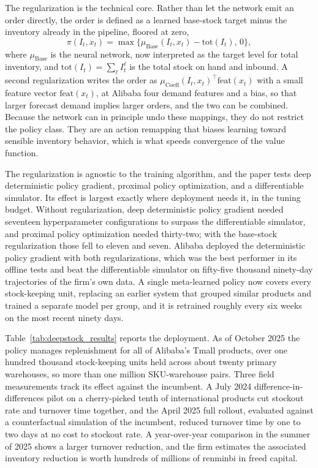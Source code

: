The regularization is the technical core. Rather than let the network emit an order directly, the order is defined as a learned base-stock target minus the inventory already in the pipeline, floored at zero,
\begin{equation}
\pi(I_t,x_t)=\max\big\{\mu_{\mathrm{Base}}(I_t,x_t)-\mathrm{tot}(I_t),\,0\big\},
\end{equation}
where $\mu_{\mathrm{Base}}$ is the neural network, now interpreted as the target level for total inventory, and $\mathrm{tot}(I_t)=\sum_{\ell}I_t^{\ell}$ is the total stock on hand and inbound. A second regularization writes the order as $\mu_{\mathrm{Coeff}}(I_t,x_t)^{\top}\mathrm{feat}(x_t)$ with a small feature vector $\mathrm{feat}(x_t)$, at Alibaba four demand features and a bias, so that larger forecast demand implies larger orders, and the two can be combined. Because the network can in principle undo these mappings, they do not restrict the policy class. They are an action remapping that biases learning toward sensible inventory behavior, which is what speeds convergence of the value function.

The regularization is agnostic to the training algorithm, and the paper tests deep deterministic policy gradient, proximal policy optimization, and a differentiable simulator. Its effect is largest exactly where deployment needs it, in the tuning budget. Without regularization, deep deterministic policy gradient needed seventeen hyperparameter configurations to surpass the differentiable simulator, and proximal policy optimization needed thirty-two; with the base-stock regularization those fell to eleven and seven. Alibaba deployed the deterministic policy gradient with both regularizations, which was the best performer in its offline tests and beat the differentiable simulator on fifty-five thousand ninety-day trajectories of the firm's own data. A single meta-learned policy now covers every stock-keeping unit, replacing an earlier system that grouped similar products and trained a separate model per group, and it is retrained roughly every six weeks on the most recent ninety days.

Table~\ref{tab:deepstock_results} reports the deployment. As of October 2025 the policy manages replenishment for all of Alibaba's Tmall products, over one hundred thousand stock-keeping units held across about twenty primary warehouses, so more than one million SKU-warehouse pairs. Three field measurements track its effect against the incumbent. A July 2024 difference-in-differences pilot on a cherry-picked tenth of international products cut stockout rate and turnover time together, and the April 2025 full rollout, evaluated against a counterfactual simulation of the incumbent, reduced turnover time by one to two days at no cost to stockout rate. A year-over-year comparison in the summer of 2025 shows a larger turnover reduction, and the firm estimates the associated inventory reduction is worth hundreds of millions of renminbi in freed capital.


